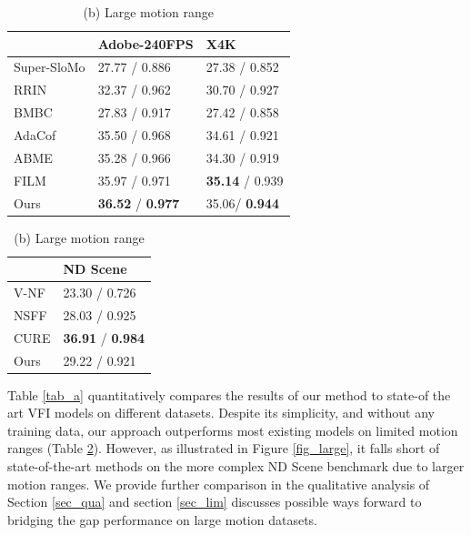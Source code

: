 \documentclass{article}
\begin{document}
\begin{table}[!hb]
    \caption{Quantitative comparison to state-of-the-art VFI on Standard benchmarks. Results are formatted as PSNR / SSMI.}
    \begin{minipage}[t]{.5\linewidth}
      \centering
      \caption*{(a) Limited motion range}
      \begin{tabular}[t]{l | l | l }
       &  Adobe-240FPS &  X4K  \\
      \hline
      Super-SloMo \citep{jiang2018super} &  27.77 / 0.886 & 27.38 / 0.852  \\
      RRIN \cite{li2020video}  & 32.37 / 0.962 & 30.70 / 0.927  \\
      BMBC \citep{park2020bmbc}  & 27.83 / 0.917 & 27.42 / 0.858   \\
      AdaCof \cite{lee2020adacof} & 35.50 / 0.968 & 34.61 / 0.921 \\
      ABME   \cite{park2021asymmetric} & 35.28 / 0.966 & 34.30 / 0.919 \\
      FILM   \cite{reda2022film} &	35.97 / 0.971 & \textbf{35.14} / 0.939 \\
      Ours	& \textbf{36.52} / \textbf{0.977} & 35.06/ \textbf{0.944} \\
      \end{tabular}
    \label{tab_a}
    \end{minipage}%
    \begin{minipage}[t]{.5\linewidth}
      \centering
      \caption*{(b) Large motion range}
        \begin{tabular}[t]{l | l }
        	    &   ND Scene  \\
        \hline
        V-NF \cite{mildenhall2020nerf}   &  23.30 / 0.726 \\
        NSFF \cite{li2021neural}   & 28.03 / 0.925 \\
        CURE \cite{shangguan2022learning}   & \textbf{36.91} / \textbf{0.984} \\
        Ours	     & 29.22 / 0.921
        \end{tabular}
	\label{tab_b}
    \end{minipage}

\end{table}

Table \ref{tab_a} quantitatively compares the results of our method to state-of the art VFI models on different datasets.
Despite its simplicity, and without any training data, our approach outperforms most existing models on limited motion ranges (Table \ref{tab_b}).
However, as illustrated in Figure \ref{fig_large}, it falls short of state-of-the-art methods on the more complex ND Scene benchmark due to larger motion ranges.
We provide further comparison in the qualitative analysis of Section \ref{sec_qua} and section \ref{sec_lim}
discusses possible ways forward to bridging the gap performance on large motion datasets.
\end{document}
